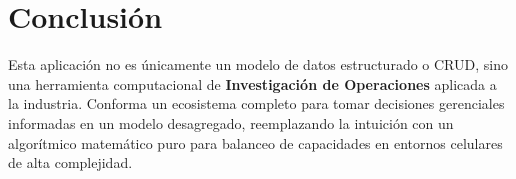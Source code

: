 \documentclass[12pt,a4paper]{article}
\begin{document}
\section{Conclusión}

Esta aplicación no es únicamente un modelo de datos estructurado o CRUD, sino una herramienta computacional de \textbf{Investigación de Operaciones} aplicada a la industria. Conforma un ecosistema completo para tomar decisiones gerenciales informadas en un modelo desagregado, reemplazando la intuición con un algorítmico matemático puro para balanceo de capacidades en entornos celulares de alta complejidad.
\end{document}
